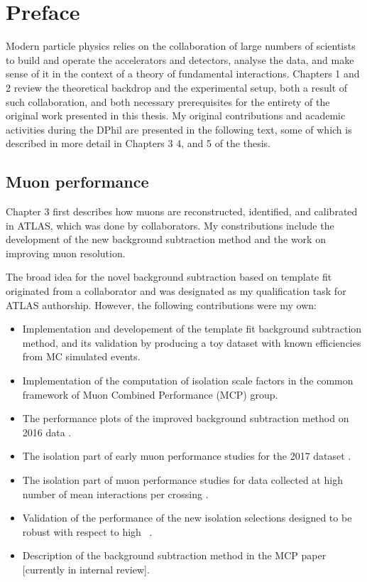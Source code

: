 \chapter*{Preface}

Modern particle physics relies on the collaboration of large
numbers of scientists to build and operate the accelerators and
detectors, analyse the data, and make sense of it in the
context of a theory of fundamental interactions. Chapters 1
and 2 review the theoretical backdrop and the experimental
setup, both a result of such collaboration, and both necessary
prerequisites for the entirety of the original work presented
in this thesis. My original contributions and academic
activities during the DPhil are presented in the following
text, some of which is described in more detail in Chapters 3
4, and 5 of the thesis.

\section*{Muon performance}

Chapter 3 first describes how muons are reconstructed,
identified, and calibrated in ATLAS, which was done by
collaborators. My constributions include the development
of the new background subtraction method and the work on
improving muon resolution.

The broad idea for the novel background subtraction
based on template fit originated from a collaborator and 
was designated as my qualification task for ATLAS authorship.
However, the following contributions were my own:
\begin{itemize}
\item Implementation and developement of the template fit background
subtraction method, and its validation by producing a toy
dataset with known efficiencies from MC simulated events.
\item Implementation of the computation of isolation scale factors in
the common framework of Muon Combined Performance (MCP) group.
\item The performance plots of the improved background
subtraction method on 2016 data \cite{Zgubic:2293041}.
\item The isolation part of early muon performance
studies for the 2017 dataset \cite{Bellomo:2282672}.
\item The isolation part of muon performance
studies for data collected at high number of mean interactions
per crossing \cite{Kohler:2293040}.
\item Validation of the performance of the new isolation
selections designed to be robust with respect to high
\pileup~\cite{Zgubic:2320874}.
\item Description of the background subtraction method in
the MCP paper [currently in internal review].
\end{itemize}

